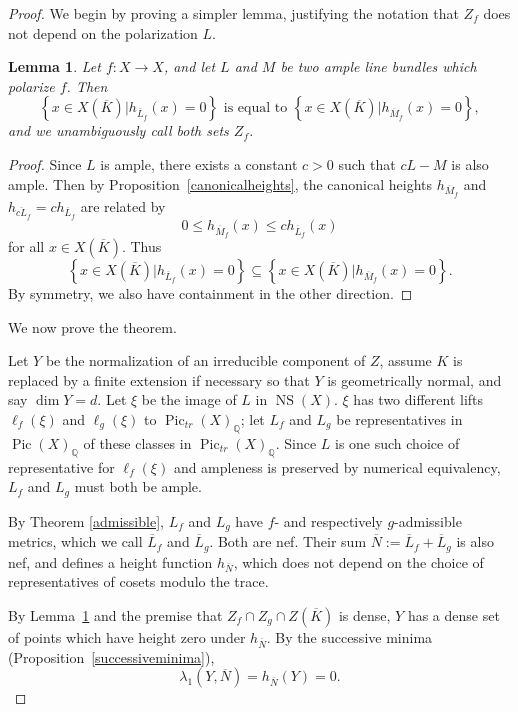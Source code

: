 \documentclass[times, doublespace]{amsart}
\numberwithin{equation}{section}
\theoremstyle{plain}
\newtheorem{lemma}[equation]{Lemma}
\theoremstyle{definition}
\DeclareMathOperator{\Pic}{Pic}
\DeclareMathOperator{\NS}{NS}
\newcommand{\trP}[1]{\operatorname{Pic}_{tr}(#1)}
\newcommand{\Q}{\mathbb{Q}}
\begin{document}
\begin{proof} We begin by proving a simpler lemma, justifying the notation that $Z_f$ does not depend on the polarization $L$.

\begin{lemma}\label{multiplepolarizations}
Let $f:X\to X$, and let $L$ and $M$ be two ample line bundles which polarize $f$. Then
\[ \left\{x\in X(\overline K)\big|h_{\overline L_f}(x)=0\right\}\text{ is equal to }\left\{x\in X(\overline K)\big|h_{\overline M_f}(x)=0\right\},\]
and we unambiguously call both sets $Z_f$.
\end{lemma}

\begin{proof}
Since $L$ is ample, there exists a constant $c>0$ such that $cL-M$ is also ample. Then by Proposition~\ref{canonicalheights}, the canonical heights $h_{\overline M_f}$ and $h_{\overline {cL}_f}=ch_{\overline L_f}$ are related by
\[ 0\le h_{\overline M_f}(x)\le ch_{\overline L_f}(x)\]
for all $x\in X(\overline K)$. Thus 
\[ \left\{x\in X(\overline K)|h_{\overline L_f}(x)=0\right\}\subseteq\left\{x\in X(\overline K)|h_{\overline M_f}(x)=0\right\}.\]
By symmetry, we also have containment in the other direction.
\end{proof}




We now prove the theorem.

Let $Y$ be the normalization of an irreducible component of $Z$, assume $K$ is replaced by a finite extension if necessary so that $Y$ is geometrically normal, and say $\dim Y=d$. 
Let $\xi$ be the image of $L$ in $\NS(X)$. $\xi$ has two different lifts $\ell_f(\xi)$ and $\ell_g(\xi)$ to $\trP{X}_{\Q}$; let $L_f$ and $L_g$ be representatives in $\Pic(X)_{\Q}$ of these classes in $\trP{X}_{\Q}$. Since $L$ is one such choice of representative for $\ell_f(\xi)$ and ampleness is preserved by numerical equivalency, $L_f$ and $L_g$ must both be ample. 

By Theorem \ref{admissible}, $L_f$ and $L_g$ have $f$- and respectively $g$-admissible metrics, which we call $\overline L_f$ and $\overline L_g$. Both are nef. Their sum $\overline N:=\overline L_f+\overline L_g$ is also nef, and defines a height function $h_{\overline N}$, which does not depend on the choice of representatives of cosets modulo the trace.

 By Lemma~\ref{multiplepolarizations} and the premise that $Z_f\cap Z_g\cap Z(\overline K)$ is dense, $Y$ has a dense set of points which have height zero under $h_{\overline N}$.  
By the successive minima (Proposition~\ref{successiveminima}),
\[ \lambda_1(Y,{\overline N})=h_{\overline N}(Y)=0.\]


\end{proof}
\end{document}
